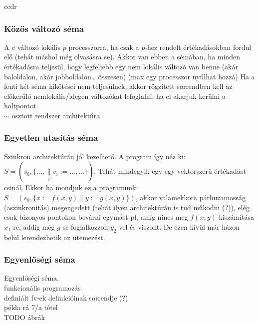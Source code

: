 ccdr\documentclass{article}
\begin{document}
\subsubsection*{Közös változó séma}

A $v$ változó lokális $p$ processzorra, ha csak a $p$-hez rendelt értékadásokban fordul elő (tehát máshol még olvasásra se). Akkor van ebben a sémában, ha minden értékadásra teljesül, hogy legfeljebb egy nem lokális változó van benne (akár baloldalon, akár jobboldalon… összesen) (max egy processzor nyúlhat hozzá) Ha a fenti két séma kikötései nem teljesülnek, akkor rögzített sorrendben kell az előkerülő nemlokális/idegen változókat lefoglalni, ha el akarjuk kerülni a holtpontot.\\
$\sim$ osztott rendszer architektúra
\subsubsection*{Egyetlen utasítás séma}
Szinkron architektúrán jól kezelhető. A program így néz ki: $S = (s_0, \lbrace \dots, \underset{i}{\parallel} v_i := \dots, \dots \rbrace)$. Tehát mindegyik egy-egy vektorszerű értékadást csinál. Ekkor ha mondjuk ez a programunk: $S = (s_0, \lbrace x:= f(x,y) \parallel y:= g(x,y)\rbrace)$, akkor valamekkora párhuzamosság (aszinkronitás) megengedett (tehát ilyen architektúrán is tud működni (?)), elég csak bizonyos pontokon bevárni egymást pl, amíg nincs meg $f(x,y)$ kiszámítása $x_1$-re, addig még $g$ se foglalkozzon $y_2$-vel és viszont. De ezen kívül már házon belül lerendezhetik az ütemezést.
\subsubsection*{Egyenlőségi séma}
Egyenlőségi séma.\\
funkcionális programozás\\
definiált fv-ek definícióinak sorrendje (?)\\
példa rá 7/a tétel\\
TODO ábrák
\end{document}
